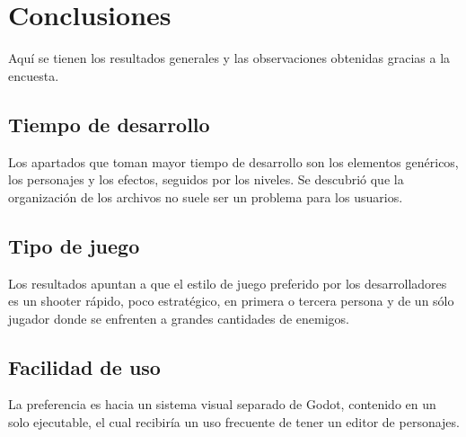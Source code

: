 \documentclass[]{article}
\begin{document}
\section{Conclusiones}
Aqu\'i se tienen los resultados generales y las observaciones obtenidas gracias a la encuesta. 
\subsection{Tiempo de desarrollo}
Los apartados que toman mayor tiempo de desarrollo son los elementos gen\'ericos, los personajes y los efectos, seguidos por los niveles. Se descubri\'o que la organizaci\'on de los archivos no suele ser un problema para los usuarios. 
\subsection{Tipo de juego}
Los resultados apuntan a que el estilo de juego preferido por los desarrolladores es un shooter r\'apido, poco estrat\'egico, en primera o tercera persona y de un s\'olo jugador donde se enfrenten a grandes cantidades de enemigos. 
\subsection{Facilidad de uso}
La preferencia es hacia un sistema visual separado de Godot, contenido en un solo ejecutable, el cual recibir\'ia un uso frecuente de tener un editor de personajes.  
\end{document}
